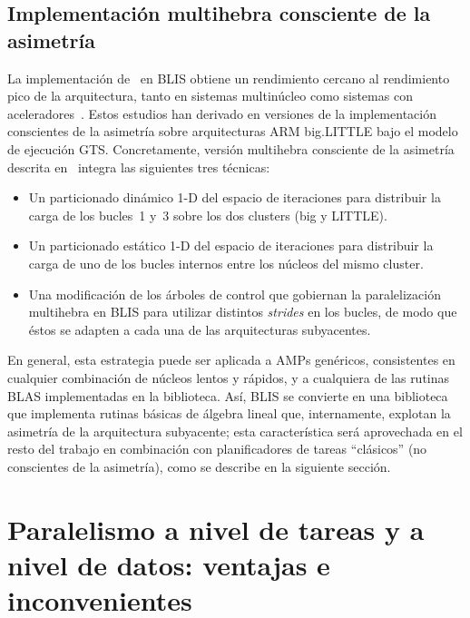 

\subsection{Implementación multihebra consciente de la asimetría}

La implementación de \gemm\ en BLIS obtiene un rendimiento cercano al
rendimiento pico de la arquitectura, tanto en sistemas multinúcleo como
sistemas con aceleradores~\cite{BLIS2,BLIS3}.  Estos estudios han derivado en
versiones de la implementación conscientes de la asimetría sobre
arquitecturas ARM big.LITTLE bajo el modelo de ejecución
GTS. Concretamente, versión multihebra consciente de la asimetría descrita
en~\cite{asymBLIS} integra las siguientes tres técnicas:
\begin{itemize}
\item Un particionado dinámico 1-D del espacio de iteraciones para distribuir la carga de los bucles~1 y~3 sobre los dos
	clusters (big y LITTLE).
\item Un particionado estático 1-D del espacio de iteraciones para distribuir la carga de uno de los  bucles internos entre los núcleos
	del mismo cluster.
\item Una modificación de los árboles de control que gobiernan la paralelización multihebra en BLIS para utilizar distintos {\em strides} en 
	los bucles, de modo que éstos se adapten a cada una de las arquitecturas subyacentes.
\end{itemize}

En general, esta estrategia puede ser aplicada a AMPs genéricos, consistentes en cualquier combinación de núcleos lentos y rápidos, y a cualquiera
de las rutinas BLAS implementadas en la biblioteca. Así, BLIS se convierte en una biblioteca que implementa rutinas básicas de álgebra lineal que,
internamente, explotan la asimetría de la arquitectura subyacente; esta característica será aprovechada en el resto del trabajo en combinación
con planificadores de tareas ``clásicos'' (no conscientes de la asimetría), como se describe en la siguiente sección.


\section{Paralelismo a nivel de tareas y a nivel de datos: ventajas e inconvenientes}
\label{sec:comparativa}

